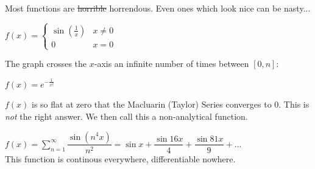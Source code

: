 \documentclass[10pt]{scrartcl}
\begin{document}
Most functions are \sout{horrible} horrendous.
Even ones which look nice can be nasty...\\



\begin{example} $f(x) = \begin{cases}
 \sin(\frac{1}{x}) & x \neq 0\\
 0 & x = 0
 \end{cases}$\\
 
 \end{example}

The graph crosses the $x$-axis an infinite number of times between $[0,n]$:

\begin{center}
\end{center}\vsp


\begin{example} $f(x) = e^{-\frac{1}{x^2}}$
\begin{center}
\end{center}

$f(x)$ is so flat at zero that the Macluarin (Taylor) Series converges to 0. This is \emph{not} the right answer. We then call this a non-analytical function.
\end{example}\vspace*{5pt}


\begin{example} $f(x) = \displaystyle{\sum_{n=1}^{\infty} } \dfrac{\sin (n^4x)}{n^2} = \sin x + \dfrac{\sin 16x}{4} + \dfrac{\sin 81x}{9} + \dots$\\

This function is continous everywhere, differentiable nowhere.\\
\end{example}
\end{document}
